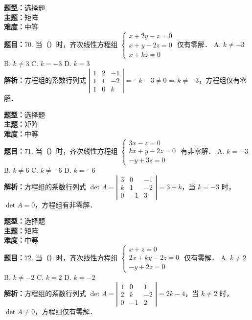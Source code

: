 \documentclass{ctexart}
\newenvironment{question}[5]{%
	\noindent\textbf{题型：}#1\\
	\textbf{主题：}#2\\
	\textbf{难度：}#3\\
	\textbf{题目：}#4\\
	\textbf{解析：}#5\\
	\vspace{1em}
}{}
\begin{document}
	\begin{question}
		{选择题}
		{矩阵}
		{中等}
		{70. 当（）时，齐次线性方程组 \(\left\{\begin{array}{c}x+2 y-z=0 \\ x+y-2 z=0 \\ x+k z=0\end{array}\right.\) 仅有零解．
			A. \(k \neq-3\)
			B. \(k \neq 3\)
			C. \(k=-3\)
			D. \(k=3\)}
		{方程组的系数行列式 \(\left|\begin{array}{lll}1 & 2 & -1 \\ 1 & 1 & -2 \\ 1 & 0 & k\end{array}\right|=-k-3 \neq 0 \Rightarrow k \neq-3\)，方程组仅有零解．}
	\end{question}
	
	
	\begin{question}
		{选择题}
		{矩阵}
		{中等}
		{71. 当（）时，齐次线性方程组 \(\left\{\begin{array}{l}3 x-z=0 \\ k x+y-2 z=0 \\ -y+3 z=0\end{array}\right.\) 有非零解．
			A. \(k=-3\)
			B. \(k \neq 6\)
			C. \(k \neq-6\)
			D. \(k=-6\)}
		{方程组的系数行列式 \(\operatorname{det} A=\left|\begin{array}{ccc}3 & 0 & -1 \\ k & 1 & -2 \\ 0 & -1 & 3\end{array}\right|=3+k\)，当 \(k=-3\) 时，\(\operatorname{det} A=0\)，方程组有非零解．}
	\end{question}
	
	\begin{question}
		{选择题}
		{矩阵}
		{中等}
		{72. 当（）时，齐次线性方程组 \(\left\{\begin{array}{l}x+z=0 \\ 2 x+k y-2 z=0 \\ -y+2 z=0\end{array}\right.\) 仅有零解．
			A. \(k \neq 2\)
			B. \(k \neq-2\)
			C. \(k=2\)
			D. \(k=-2\)}
		{方程组的系数行列式 \(\operatorname{det} A=\left|\begin{array}{ccc}1 & 0 & 1 \\ 2 & k & -2 \\ 0 & -1 & 2\end{array}\right|=2 k-4\)，当 \(k \neq 2\) 时，\(\operatorname{det} A \neq 0\)，方程组仅有零解．}
	\end{question}
	
\end{document}
